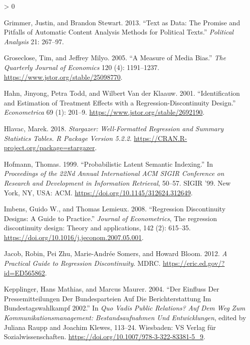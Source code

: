 \documentclass[
  12pt,
]{article}
\newlength{\cslhangindent}
\newenvironment{CSLReferences}[2] %
 {%
  \setlength{\parindent}{0pt}
  \ifodd #1 \everypar{\setlength{\hangindent}{\cslhangindent}}\ignorespaces\fi
  \ifnum #2 > 0
  \setlength{\parskip}{#2\baselineskip}
  \fi
 }%
 {}
\begin{document}
\begin{CSLReferences}{1}{0}
\leavevmode\hypertarget{ref-grimmer_text_2013}{}%
Grimmer, Justin, and Brandon Stewart. 2013. {``Text as Data: The Promise
and Pitfalls of Automatic Content Analysis Methods for Political
Texts.''} \emph{Political Analysis} 21: 267--97.

\leavevmode\hypertarget{ref-groseclose_measure_2005}{}%
Groseclose, Tim, and Jeffrey Milyo. 2005. {``A Measure of Media Bias.''}
\emph{The Quarterly Journal of Economics} 120 (4): 1191--1237.
\url{https://www.jstor.org/stable/25098770}.

\leavevmode\hypertarget{ref-hahn_identification_2001}{}%
Hahn, Jinyong, Petra Todd, and Wilbert Van der Klaauw. 2001.
{``Identification and Estimation of Treatment Effects with a
Regression-Discontinuity Design.''} \emph{Econometrica} 69 (1): 201--9.
\url{https://www.jstor.org/stable/2692190}.

\leavevmode\hypertarget{ref-hlavac_stargazer_2018}{}%
Hlavac, Marek. 2018. \emph{Stargazer: Well-Formatted Regression and
Summary Statistics Tables. R Package Version 5.2.2}.
\url{https://CRAN.R-project.org/package=stargazer}.

\leavevmode\hypertarget{ref-hofmann_probabilistic_1999}{}%
Hofmann, Thomas. 1999. {``Probabilistic Latent Semantic Indexing.''} In
\emph{Proceedings of the 22Nd Annual International {ACM} {SIGIR}
Conference on Research and Development in Information Retrieval},
50--57. {SIGIR} '99. New York, {NY}, {USA}: {ACM}.
\url{https://doi.org/10.1145/312624.312649}.

\leavevmode\hypertarget{ref-imbens_regression_2008}{}%
Imbens, Guido W., and Thomas Lemieux. 2008. {``Regression Discontinuity
Designs: A Guide to Practice.''} \emph{Journal of Econometrics}, The
regression discontinuity design: Theory and applications, 142 (2):
615--35. \url{https://doi.org/10.1016/j.jeconom.2007.05.001}.

\leavevmode\hypertarget{ref-jacob_practical_2012}{}%
Jacob, Robin, Pei Zhu, Marie-Andrée Somers, and Howard Bloom. 2012.
\emph{A Practical Guide to Regression Discontinuity}. {MDRC}.
\url{https://eric.ed.gov/?id=ED565862}.

\leavevmode\hypertarget{ref-kepplinger_einfluss_2004}{}%
Kepplinger, Hans Mathias, and Marcus Maurer. 2004. {``Der Einfluss Der
Pressemitteilungen Der Bundesparteien Auf Die Berichterstattung Im
Bundestagswahlkampf 2002.''} In \emph{Quo Vadis Public Relations? Auf
Dem Weg Zum Kommunikationsmanagement: Bestandsaufnahmen Und
Entwicklungen}, edited by Juliana Raupp and Joachim Klewes, 113--24.
Wiesbaden: {VS} Verlag für Sozialwissenschaften.
\url{https://doi.org/10.1007/978-3-322-83381-5_9}.


\end{CSLReferences}
\end{document}
